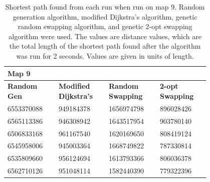 \documentclass{article}
\begin{document}
\begin{appendices}
\begin{table}[H]
    \caption{Shortest path found from each run when run on map 9. Random generation algorithm, modified Dijkstra's algorithm, genetic random swapping algorithm, and genetic 2-opt swapping algorithm were used. The values are distance values, which are the total length of the shortest path found after the algorithm was run for 2 seconds. Values are given in units of length.}
    \centering
    \begin{tabular}{|p{0.2\linewidth}|p{0.2\linewidth}|p{0.2\linewidth}|p{0.2\linewidth}|}
    \hline
        \textbf{Map 9} & ~ & ~ & ~ \\ \hline
        \textbf{Random Gen} & \textbf{Modified Dijkstra's} & \textbf{Random Swapping} & \textbf{2-opt Swapping} \\ \hline
        6553370088 & 949184378 & 1656974798 & 896028426 \\ \hline
        6565113386 & 946308942 & 1643517954 & 903780140 \\ \hline
        6506833168 & 961167540 & 1620169650 & 808419124 \\ \hline
        6545958006 & 945003364 & 1668749822 & 787330814 \\ \hline
        6535809660 & 956124694 & 1613793366 & 806036378 \\ \hline
        6562710126 & 951048114 & 1582440390 & 779322396 \\ \hline
    \end{tabular}
\end{table}


\end{appendices}
\end{document}
